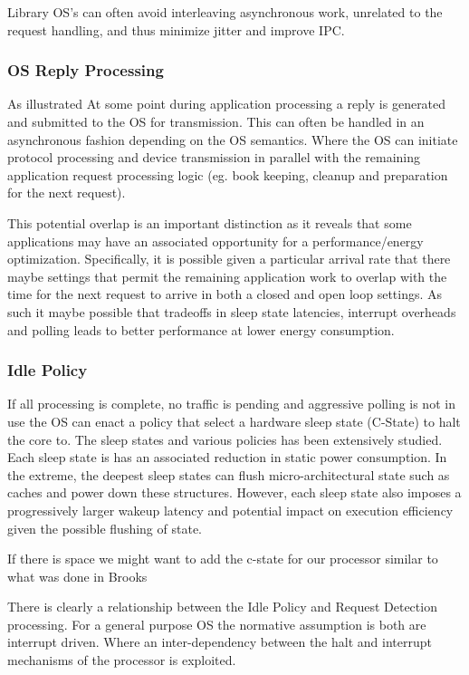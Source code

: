 Library OS's can often avoid interleaving asynchronous work, unrelated to the request handling,  and thus minimize jitter and improve IPC. 

\subsubsection{OS Reply Processing}
\label{sec:workflow:osrepproc}

As illustrated At some point during application processing a reply is generated and submitted to the OS for transmission.  This can often be handled in an asynchronous fashion depending on the OS semantics.  Where the OS can initiate protocol processing and device transmission in parallel with the remaining application request processing logic (eg. book keeping, cleanup and preparation for the next request).

This potential overlap is an important distinction as it reveals that some applications may have an associated opportunity for a performance/energy optimization.  Specifically, it is possible given a particular arrival rate that there maybe settings that permit the remaining application work to overlap with the time for the next request to arrive in both a closed and open loop settings.  As such it maybe possible that tradeoffs in sleep state latencies, interrupt overheads and polling leads to better performance at lower energy consumption.  

\subsubsection{Idle Policy}
\label{sec:workflow:idlepolicy}

If all processing is complete, no traffic is pending and aggressive polling is not in use the OS can enact a policy that select a hardware sleep state (C-State) to halt the core to.  The sleep states and various policies has been extensively studied\cite{}.  Each sleep state is has an associated reduction in static power consumption. In the extreme, the deepest sleep states can flush micro-architectural state such as caches and power down these structures. However, each sleep state also imposes a progressively larger wakeup latency and potential impact on execution efficiency given the possible flushing of state. 

If there is space we might want to add the c-state for our processor similar to what was done in Brooks

There is clearly a relationship between the Idle Policy and Request Detection processing.  For a general purpose OS the normative assumption is both are interrupt driven.  Where an inter-dependency between the halt and interrupt mechanisms of the processor is exploited.  

